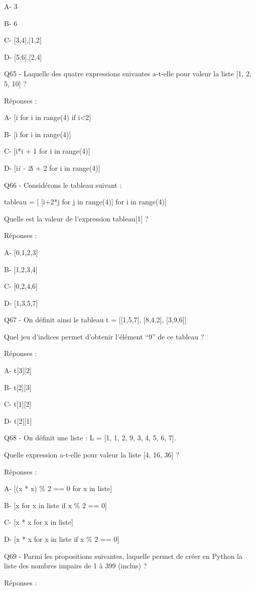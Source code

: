 \documentclass[
]{book}
\begin{document}
A- 3

B- 6

C- {[}3,4{]},{[}1,2{]}

D- {[}5,6{]},{[}2,4{]}

Q65 - Laquelle des quatre expressions suivantes a-t-elle pour valeur la liste {[}1, 2, 5, 10{]} ?

Réponses :

A- {[}i for i in range(4) if i\textless2{]}

B- {[}i for i in range(4){]}

C- {[}i*i + 1 for i in range(4){]}

D- {[}i\emph{i - 2}i + 2 for i in range(4){]}

Q66 - Considérons le tableau suivant :

tableau = {[} {[}i+2*j for j in range(4){]} for i in range(4){]}

Quelle est la valeur de l'expression tableau{[}1{]} ?

Réponses :

A- {[}0,1,2,3{]}

B- {[}1,2,3,4{]}

C- {[}0,2,4,6{]}

D- {[}1,3,5,7{]}

Q67 - On définit ainsi le tableau t = {[}{[}1,5,7{]}, {[}8,4,2{]}, {[}3,9,6{]}{]}

Quel jeu d'indices permet d'obtenir l'élément ``9'' de ce tableau ?

Réponses :

A- t{[}3{]}{[}2{]}

B- t{[}2{]}{[}3{]}

C- t{[}1{]}{[}2{]}

D- t{[}2{]}{[}1{]}

Q68 - On définit une liste : L = {[}1, 1, 2, 9, 3, 4, 5, 6, 7{]}.

Quelle expression a-t-elle pour valeur la liste {[}4, 16, 36{]} ?

Réponses :

A- {[}(x * x) \% 2 == 0 for x in liste{]}

B- {[}x for x in liste if x \% 2 == 0{]}

C- {[}x * x for x in liste{]}

D- {[}x * x for x in liste if x \% 2 == 0{]}

Q69 - Parmi les propositions suivantes, laquelle permet de créer en Python la liste des nombres impairs de 1 à 399 (inclus) ?

Réponses :
\end{document}

